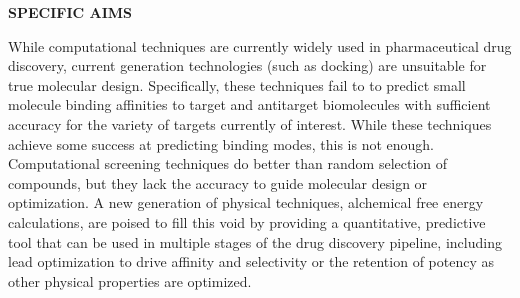 \documentclass[11pt]{article}
\begin{document}





\noindent \begin{center}
{\bf SPECIFIC AIMS}
\end{center}

While computational techniques are currently widely used in pharmaceutical drug discovery, current generation technologies (such as docking) are unsuitable for true molecular design. 
Specifically, these techniques fail to to predict small molecule binding affinities to target and antitarget biomolecules with sufficient accuracy for the variety of targets currently of interest. 
While these techniques achieve some success at predicting binding modes, this is not enough. 
Computational screening techniques do better than random selection of compounds, but they lack the accuracy to guide molecular design or optimization. 
A new generation of physical techniques, alchemical free energy calculations, are poised to fill this void by providing a quantitative, predictive tool that can be used in multiple stages of the drug discovery pipeline, including lead optimization to drive affinity and selectivity or the retention of potency as other physical properties are optimized. 
\end{document}
